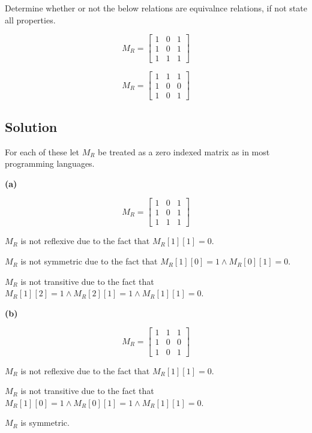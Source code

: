 \documentclass[paper=a4, fontsize=11pt]{scrartcl} %
\numberwithin{equation}{section} %
\numberwithin{figure}{section} %
\numberwithin{table}{section} %
\begin{document}
Determine whether or not the below relations are equivalnce relations, if not state all properties.

$$M_R = \begin{bmatrix}
1 & 0 & 1 \\
1 & 0 & 1 \\
1 & 1 & 1 \end{bmatrix}$$

$$M_R = \begin{bmatrix}
1 & 1 & 1 \\
1 & 0 & 0 \\
1 & 0 & 1 \end{bmatrix}$$

\subsection{Solution}

For each of these let $M_R$ be treated as a zero indexed matrix as in most programming languages.

\textbf{(a)}

$$M_R = \begin{bmatrix}
1 & 0 & 1 \\
1 & 0 & 1 \\
1 & 1 & 1 \end{bmatrix}$$

$M_R$ is not reflexive due to the fact that $M_R[1][1] = 0$.

$M_R$ is not symmetric due to the fact that $M_R[1][0] = 1 \land M_R[0][1] = 0$.

$M_R$ is not transitive due to the fact that $M_R[1][2] = 1 \land M_R[2][1] = 1 \land M_R[1][1] = 0$.

\textbf{(b)}

$$M_R = \begin{bmatrix}
1 & 1 & 1 \\
1 & 0 & 0 \\
1 & 0 & 1 \end{bmatrix}$$

$M_R$ is not reflexive due to the fact that $M_R[1][1] = 0$.

$M_R$ is not transitive due to the fact that $M_R[1][0] = 1 \land M_R[0][1] = 1 \land M_R[1][1] = 0$.

$M_R$ is symmetric.

\end{document}
